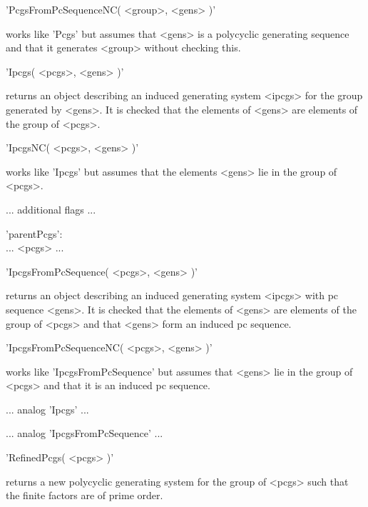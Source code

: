 'PcgsFromPcSequenceNC( <group>, <gens> )'

works like  'Pcgs' but assumes  that <gens>  is a  polycyclic  generating
sequence and that it generates <group> without checking this.


'Ipcgs( <pcgs>, <gens> )'

returns an object describing an induced generating system <ipcgs> for the
group generated by <gens>.  It is checked that the elements of <gens> are
elements of the group of <pcgs>.

'IpcgsNC( <pcgs>, <gens> )'

works like 'Ipcgs' but assumes that the elements  <gens> lie in the group
of <pcgs>.

... additional flags ...

'parentPcgs': \\
    ... <pcgs> ...


'IpcgsFromPcSequence( <pcgs>, <gens> )'

returns an object describing an induced generating system <ipcgs> with pc
sequence <gens>.  It is checked that the elements  of <gens> are elements
of the group of <pcgs> and that <gens> form an induced pc sequence.

'IpcgsFromPcSequenceNC( <pcgs>, <gens> )'

works like 'IpcgsFromPcSequence' but assumes that <gens> lie in the group
of <pcgs> and that it is an induced pc sequence.


... analog 'Ipcgs' ...


... analog 'IpcgsFromPcSequence' ...



'RefinedPcgs( <pcgs> )'

returns a new  polycyclic generating system  for the group of <pcgs> such
that the finite factors are of prime order.


